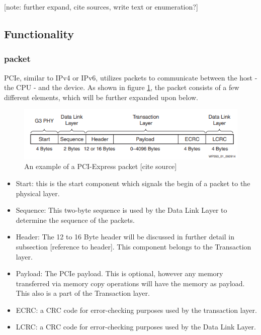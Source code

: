 [note: further expand, cite sources, write text or enumeration?]

\subsection{Functionality}

\subsubsection{packet}
PCIe, similar to IPv4 or IPv6, utilizes packets to communicate between the host - the CPU - and the device. As shown in figure \ref{fig:packet}, the packet consists of a few different elements, which will be further expanded upon below. 

\begin{figure}
\includegraphics[width = \linewidth]{figures/PCIE-packet}
\caption{An example of a PCI-Express packet [cite source]}
\label{fig:packet}
\end{figure}

\begin{itemize}
\item Start: this is the start component which signals the begin of a packet to the physical layer.
\item Sequence: This two-byte sequence is used by the Data Link Layer to determine the sequence of the packets.
\item Header: The 12 to 16 Byte header will be discussed in further detail in subsection [reference to header]. This component belongs to the Transaction layer.
\item Payload: The PCIe payload. This is optional, however any memory transferred via memory copy operations will have the memory as payload. This also is a part of the Transaction layer.
\item ECRC: a CRC code for error-checking purposes used by the transaction layer.
\item LCRC: a CRC code for error-checking purposes used by the Data Link Layer.
\end{itemize}



